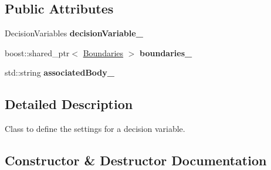 \subsection*{Public Attributes}
\begin{DoxyCompactItemize}
\item 
Decision\+Variables {\bfseries decision\+Variable\+\_\+}\hypertarget{structtudat_1_1optimization_1_1SingleDecisionVariableSettings_aaa836b395e211d6c81076ad5dbe755f5}{}\label{structtudat_1_1optimization_1_1SingleDecisionVariableSettings_aaa836b395e211d6c81076ad5dbe755f5}

\item 
boost\+::shared\+\_\+ptr$<$ \hyperlink{structtudat_1_1optimization_1_1Boundaries}{Boundaries} $>$ {\bfseries boundaries\+\_\+}\hypertarget{structtudat_1_1optimization_1_1SingleDecisionVariableSettings_ab6ed07fd3280e575a75be2f1fe3550b8}{}\label{structtudat_1_1optimization_1_1SingleDecisionVariableSettings_ab6ed07fd3280e575a75be2f1fe3550b8}

\item 
std\+::string {\bfseries associated\+Body\+\_\+}\hypertarget{structtudat_1_1optimization_1_1SingleDecisionVariableSettings_a1ef94ccbcb103a399040bb3a9b659e32}{}\label{structtudat_1_1optimization_1_1SingleDecisionVariableSettings_a1ef94ccbcb103a399040bb3a9b659e32}

\end{DoxyCompactItemize}


\subsection{Detailed Description}
Class to define the settings for a decision variable. 

\subsection{Constructor \& Destructor Documentation}
